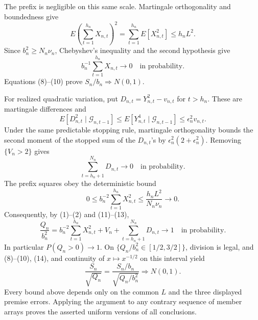 The prefix is negligible on this same scale.  Martingale orthogonality and
boundedness give
\[
 E\left(\sum_{t=1}^{h_n}X_{n,t}\right)^2
 =\sum_{t=1}^{h_n}E[X_{n,t}^2]\le h_nL^2.
\tag{9}
\]
Since \(b_n^2\ge N_n\nu_n\), Chebyshev's inequality and the second hypothesis
give
\[
 b_n^{-1}\sum_{t=1}^{h_n}X_{n,t}\longrightarrow0
 \quad\text{in probability}.
\tag{10}
\]
Equations (8)--(10) prove \(S_n/b_n\Rightarrow N(0,1)\).

For realized quadratic variation, put
\(D_{n,t}=Y_{n,t}^2-v_{n,t}\) for \(t>h_n\).  These are martingale
differences and
\[
 E[D_{n,t}^2\mid\mathcal G_{n,t-1}]
 \le E[Y_{n,t}^4\mid\mathcal G_{n,t-1}]
 \le\epsilon_n^2v_{n,t}.
\tag{11}
\]
Under the same predictable stopping rule, martingale orthogonality bounds the
second moment of the stopped sum of the \(D_{n,t}\)'s by
\(\epsilon_n^2(2+\epsilon_n^2)\).  Removing \(\{V_n>2\}\) gives
\[
 \sum_{t=h_n+1}^{N_n}D_{n,t}\longrightarrow0
 \quad\text{in probability}.
\tag{12}
\]
The prefix squares obey the deterministic bound
\[
 0\le b_n^{-2}\sum_{t=1}^{h_n}X_{n,t}^2
 \le\frac{h_nL^2}{N_n\nu_n}\longrightarrow0.
\tag{13}
\]
Consequently, by (1)--(2) and (11)--(13),
\[
 \frac{Q_n}{b_n^2}
 =b_n^{-2}\sum_{t=1}^{h_n}X_{n,t}^2+V_n
 +\sum_{t=h_n+1}^{N_n}D_{n,t}
 \longrightarrow1
 \quad\text{in probability}.
\tag{14}
\]
In particular \(P(Q_n>0)\to1\).  On
\(\{Q_n/b_n^2\in[1/2,3/2]\}\), division is legal, and (8)--(10), (14), and
continuity of \(x\mapsto x^{-1/2}\) on this interval yield
\[
 \frac{S_n}{\sqrt{Q_n}}
 =\frac{S_n/b_n}{\sqrt{Q_n/b_n^2}}\Rightarrow N(0,1).
\tag{15}
\]
Every bound above depends only on the common \(L\) and the three displayed
premise errors.  Applying the argument to any contrary sequence of member
arrays proves the asserted uniform versions of all conclusions.